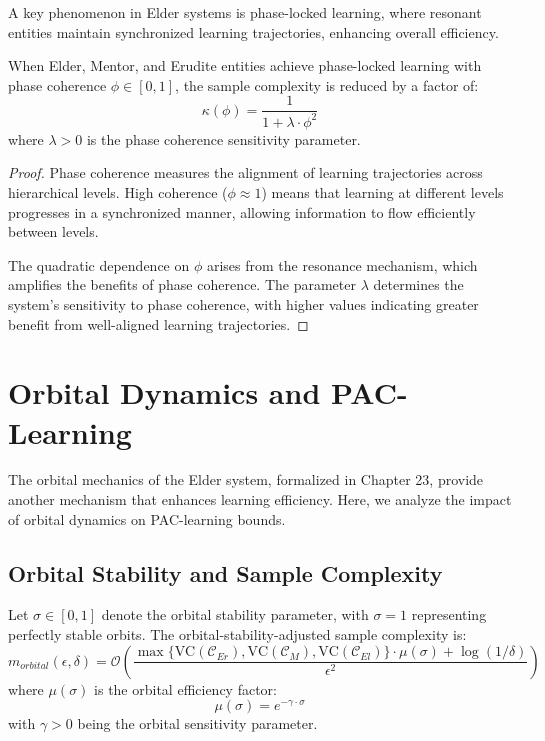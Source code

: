 A key phenomenon in Elder systems is phase-locked learning, where resonant entities maintain synchronized learning trajectories, enhancing overall efficiency.

\begin{theorem}
When Elder, Mentor, and Erudite entities achieve phase-locked learning with phase coherence $\phi \in [0, 1]$, the sample complexity is reduced by a factor of:
\begin{equation}
\kappa(\phi) = \frac{1}{1 + \lambda \cdot \phi^2}
\end{equation}
where $\lambda > 0$ is the phase coherence sensitivity parameter.
\end{theorem}

\begin{proof}
Phase coherence measures the alignment of learning trajectories across hierarchical levels. High coherence ($\phi \approx 1$) means that learning at different levels progresses in a synchronized manner, allowing information to flow efficiently between levels.

The quadratic dependence on $\phi$ arises from the resonance mechanism, which amplifies the benefits of phase coherence. The parameter $\lambda$ determines the system's sensitivity to phase coherence, with higher values indicating greater benefit from well-aligned learning trajectories.
\end{proof}

\section{Orbital Dynamics and PAC-Learning}

The orbital mechanics of the Elder system, formalized in Chapter 23, provide another mechanism that enhances learning efficiency. Here, we analyze the impact of orbital dynamics on PAC-learning bounds.

\subsection{Orbital Stability and Sample Complexity}

\begin{theorem}
Let $\sigma \in [0, 1]$ denote the orbital stability parameter, with $\sigma = 1$ representing perfectly stable orbits. The orbital-stability-adjusted sample complexity is:
\begin{equation}
m_{orbital}(\epsilon, \delta) = \mathcal{O}\left(\frac{\max\{\text{VC}(\mathcal{C}_{Er}), \text{VC}(\mathcal{C}_{M}), \text{VC}(\mathcal{C}_{El})\} \cdot \mu(\sigma) + \log(1/\delta)}{\epsilon^2}\right)
\end{equation}
where $\mu(\sigma)$ is the orbital efficiency factor:
\begin{equation}
\mu(\sigma) = e^{-\gamma \cdot \sigma}
\end{equation}
with $\gamma > 0$ being the orbital sensitivity parameter.
\end{theorem}

